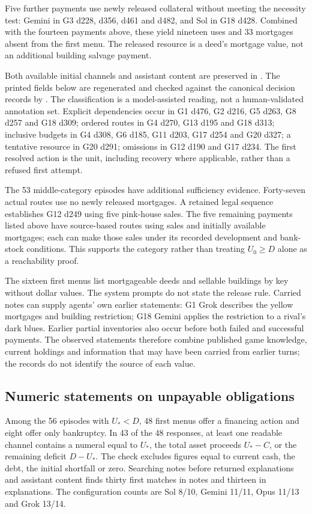 Five further payments use newly released collateral without meeting the necessity test: Gemini in G3 d228, d356, d461 and d482, and Sol in G18 d428. Combined with the fourteen payments above, these yield nineteen uses and 33 mortgages absent from the first menu. The released resource is a deed's mortgage value, not an additional building salvage payment.

Both available initial channels and assistant content are preserved in . The printed fields below are regenerated and checked against the canonical decision records by . The classification is a model-assisted reading, not a human-validated annotation set. Explicit dependencies occur in G1 d476, G2 d216, G5 d263, G8 d257 and G18 d309; ordered routes in G4 d270, G13 d195 and G18 d313; inclusive budgets in G4 d308, G6 d185, G11 d203, G17 d254 and G20 d327; a tentative resource in G20 d291; omissions in G12 d190 and G17 d234. The first resolved action is the unit, including recovery where applicable, rather than a refused first attempt.

The 53 middle-category episodes have additional sufficiency evidence. Forty-seven actual routes use no newly released mortgages. A retained legal sequence establishes G12 d249 using five pink-house sales. The five remaining payments listed above have source-based routes using sales and initially available mortgages; each can make those sales under its recorded development and bank-stock conditions. This supports the category rather than treating $U_0\geq D$ alone as a reachability proof.

The sixteen first menus list mortgageable deeds and sellable buildings by key without dollar values. The system prompts do not state the release rule. Carried notes can supply agents' own earlier statements: G1 Grok describes the yellow mortgages and building restriction; G18 Gemini applies the restriction to a rival's dark blues. Earlier partial inventories also occur before both failed and successful payments. The observed statements therefore combine published game knowledge, current holdings and information that may have been carried from earlier turns; the records do not identify the source of each value.

\subsection{Numeric statements on unpayable obligations}
Among the 56 episodes with $U_*<D$, 48 first menus offer a financing action and eight offer only bankruptcy. In 43 of the 48 responses, at least one readable channel contains a numeral equal to $U_*$, the total asset proceeds $U_*-C$, or the remaining deficit $D-U_*$. The check excludes figures equal to current cash, the debt, the initial shortfall or zero. Searching notes before returned explanations and assistant content finds thirty first matches in notes and thirteen in explanations. The configuration counts are Sol 8/10, Gemini 11/11, Opus 11/13 and Grok 13/14.

